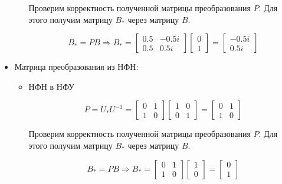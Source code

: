 \begin{itemize}
\begin{itemize}
	Проверим корректность полученной матрицы преобразования $P$. Для этого получим матрицу $B_{*}$ через матрицу $B$. 
	
	\begin{equation*}
	\text{$B_{*}=PB$}
	\Longrightarrow
	\text{$B_{*}=
	\begin{bmatrix} 0.5 &   -0.5i \\ 0.5 & 0.5i \end{bmatrix}
	\begin{bmatrix} 0 \\ 1 \end{bmatrix}
	=\begin{bmatrix} -0.5i \\ 0.5i \end{bmatrix}$}
	\end{equation*}
	
	\end{itemize}
	\item Матрица преобразования из НФН:
	\begin{itemize}

	\item НФН в НФУ
		
	\begin{equation*}
	\text{$P=U_{*}U^{-1}=
	\begin{bmatrix}0 & 1\\ 1 & 0\end{bmatrix}
	\begin{bmatrix} 1  & 0 \\ 0  &  1 \end{bmatrix}
	=\begin{bmatrix}   0  &  1\\
    	1  & 0 \end{bmatrix}$}
	\end{equation*}
	
	Проверим корректность полученной матрицы преобразования $P$. Для этого получим матрицу $B_{*}$ через матрицу $B$.
	
	\begin{equation*}
	\text{$B_{*}=PB$}
	\Longrightarrow
	\text{$B_{*}=
	\begin{bmatrix}   0  &  1\\
    	1  & 0 \end{bmatrix}
   \begin{bmatrix} 1 \\ 0 \end{bmatrix}
   =\begin{bmatrix} 0 \\ 1 \end{bmatrix}$}
	\end{equation*}
	

\end{itemize}
\end{itemize}
